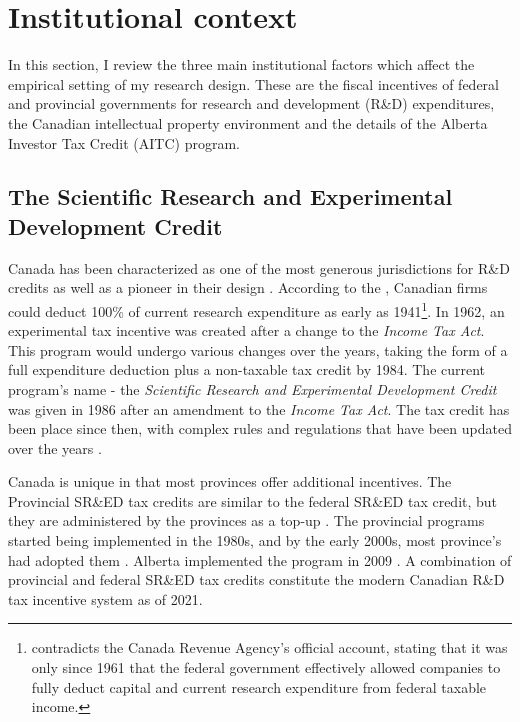 \documentclass[../main.tex]{subfiles}
\begin{document}
\section{Institutional context}
\label{sec:institutional_background}

In this section, I review the three main institutional factors which affect the empirical setting of my research design. These are the fiscal incentives of federal and provincial governments for research and development (R\&D) expenditures, the Canadian intellectual property environment and the details of the Alberta Investor Tax Credit (AITC) program.

\subsection{The Scientific Research and Experimental Development Credit}

Canada has been characterized as one of the most generous jurisdictions for R\&D credits \parencite{mckenzie08} as well as a pioneer in their design \parencite{mansfield_switzer85a}. According to the \textcite{canadarevenueagency23}, Canadian firms could deduct 100\% of current research expenditure as early as 1941\footnote{\textcite{mansfield_switzer85a} contradicts the Canada Revenue Agency's official account, stating that it was only since 1961 that the federal government effectively allowed companies to fully deduct capital and current research expenditure from federal taxable income.}. In 1962, an experimental tax incentive was created after a change to the \textit{Income Tax Act}. This program would undergo various changes over the years, taking the form of a full expenditure deduction plus a non-taxable tax credit by 1984. The current program's name - the \textit{Scientific Research and Experimental Development Credit} was given in 1986 after an amendment to the \textit{Income Tax Act}. The tax credit has been place since then, with complex rules and regulations that have been updated over the years \parencite{canadarevenueagency15}.

Canada is unique in that most provinces offer additional incentives. The Provincial SR\&ED tax credits are similar to the federal SR\&ED tax credit, but they are administered by the provinces as a top-up \parencite{warda00}. The provincial programs started being implemented in the 1980s, and by the early 2000s, most province's had adopted them \parencite{warda98,mckenzie05}. Alberta implemented the program in 2009 \parencite{brouillete13}. A combination of provincial and federal SR\&ED tax credits constitute the modern Canadian R\&D tax incentive system as of 2021.
\end{document}
